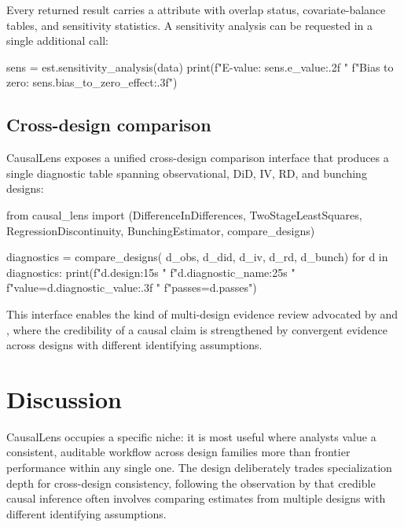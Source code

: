 \documentclass[article]{jss}
\begin{document}
Every returned result carries a  attribute with overlap
status, covariate-balance tables, and sensitivity statistics. A sensitivity
analysis can be requested in a single additional call:

\begin{Code}
sens = est.sensitivity_analysis(data)
print(f"E-value: {sens.e_value:.2f}  "
      f"Bias to zero: {sens.bias_to_zero_effect:.3f}")
\end{Code}

\subsection{Cross-design comparison}\label{sec:cross-api}

CausalLens exposes a unified cross-design comparison interface that
produces a single diagnostic table spanning observational, DiD, IV, RD,
and bunching designs:

\begin{Code}
from causal_lens import (DifferenceInDifferences,
    TwoStageLeastSquares, RegressionDiscontinuity,
    BunchingEstimator, compare_designs)

diagnostics = compare_designs(
    d_obs, d_did, d_iv, d_rd, d_bunch)
for d in diagnostics:
    print(f"{d.design:15s}  "
          f"{d.diagnostic_name:25s}  "
          f"value={d.diagnostic_value:.3f}  "
          f"passes={d.passes}")
\end{Code}

This interface enables the kind of multi-design evidence review advocated
by \citet{AbadieCattaneo2018} and \citet{AtheyImbens2017}, where the
credibility of a causal claim is strengthened by convergent evidence across
designs with different identifying assumptions.



\section{Discussion}\label{sec:discussion}

CausalLens occupies a specific niche: it is most useful where analysts value a
consistent, auditable workflow across design families more than frontier
performance within any single one. The design deliberately trades
specialization depth for cross-design consistency, following the
observation by \citet{AbadieCattaneo2018} that credible causal inference
often involves comparing estimates from multiple designs with different
identifying assumptions.
\end{document}
